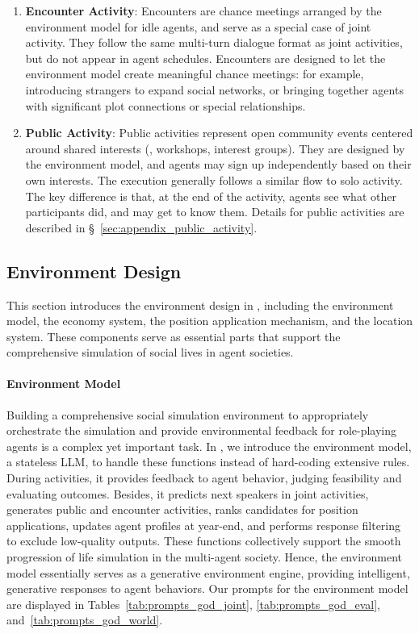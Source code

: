 \begin{enumerate}
\item \textbf{Encounter Activity}:
Encounters are chance meetings arranged by the environment model for idle agents, and serve as a special case of joint activity.
They follow the same multi-turn dialogue format as joint activities, but do not appear in agent schedules.
Encounters are designed to let the environment model create meaningful chance meetings: for example, introducing strangers to expand social networks, or bringing together agents with significant plot connections or special relationships.

\item \textbf{Public Activity}:
Public activities represent open community events centered around shared interests (\eg, workshops, interest groups).
They are designed by the environment model, and agents may sign up independently based on their own interests.
The execution generally follows a similar flow to solo activity.
The key difference is that, at the end of the activity, agents see what other participants did, and may get to know them.
Details for public activities are described in \S~\ref{sec:appendix_public_activity}.

\end{enumerate}

\subsection{Environment Design}
\label{sec:environment}

This section introduces the environment design in \method, including the environment model, the economy system, the position application mechanism, and the location system.
These components serve as essential parts that support the comprehensive simulation of social lives in agent societies.

\paragraph{Environment Model}
Building a comprehensive social simulation environment to appropriately orchestrate the simulation and provide environmental feedback for role-playing agents is a complex yet important task.
In \method, we introduce the environment model, a stateless LLM, to handle these functions instead of hard-coding extensive rules.
During activities, it provides feedback to agent behavior, judging feasibility and evaluating outcomes.
Besides, it predicts next speakers in joint activities, generates public and encounter activities, ranks candidates for position applications, updates agent profiles at year-end, and performs response filtering to exclude low-quality outputs.
These functions collectively support the smooth progression of life simulation in the multi-agent society.
Hence, the environment model essentially serves as a generative environment engine, providing intelligent, generative responses to agent behaviors.
Our prompts for the environment model are displayed in Tables~\ref{tab:prompts_god_joint}, \ref{tab:prompts_god_eval}, and~\ref{tab:prompts_god_world}.

